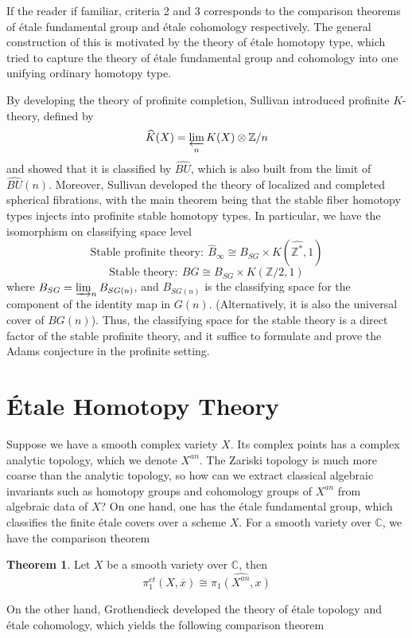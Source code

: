 \documentclass{article}
\theoremstyle{definition}
\newtheorem{theorem}{Theorem}[section]
\theoremstyle{definition}
\theoremstyle{definition}
\theoremstyle{definition}
\theoremstyle{definition}
\theoremstyle{definition}
\theoremstyle{definition}
\begin{document}
If the reader if familiar, criteria 2 and 3 corresponds to the comparison theorems of \'etale fundamental group and  \'etale cohomology respectively. The general construction of this is motivated by the theory of \'etale homotopy type, which tried to capture the theory of \'etale fundamental group and cohomology into one unifying ordinary homotopy type. 

By developing the theory of profinite completion, Sullivan introduced profinite $K$-theory, defined by 
\[\widehat{K}(X)=\varprojlim_n K(X)\otimes \mathbb{Z}/n\]
and showed that it is classified by $\widehat{BU}$, which is also built from the limit of $\widehat{BU}(n)$. Moreover, Sullivan developed the theory of localized and completed spherical fibrations, with the main theorem being that the stable fiber homotopy types injects into profinite stable homotopy types. In particular, we have the isomorphism on classifying space level 
\[\textrm{Stable profinite theory}: \ \widehat{B}_{\infty}\cong B_{SG}\times K(\widehat{\mathbb{Z}^*},1)\]
\[\textrm{Stable theory}: \ BG\cong B_{SG}\times K(\mathbb{Z}/2,1)\]
where $B_{SG}=\varinjlim_n B_{SG(n)}$, and $B_{SG(n)}$ is the classifying space for the component of the identity map in $G(n)$. (Alternatively, it is also the universal cover of $BG(n)$). Thus, the classifying space for the stable theory is a direct factor of the stable profinite theory, and it suffice to formulate and prove the Adams conjecture in the profinite setting. 








\section{\'Etale Homotopy Theory}
Suppose we have a smooth complex variety $X$. Its complex points has a complex analytic topology, which we denote $X^{an}$. The Zariski topology is much more coarse than the analytic topology, so how can we extract classical algebraic invariants such as homotopy groups and cohomology groups of $X^{an}$ from algebraic data of $X$? On one hand, one has the \'etale fundamental group, which classifies the finite \'etale covers over a scheme $X$. For a smooth variety over $\mathbb{C}$, we have the comparison theorem


\begin{tcolorbox}[colback=red!5!white,colframe=red!30!white]
\begin{theorem}
Let $X$ be a smooth variety over $\mathbb{C}$, then
\[\pi_1^{et}(X,\overline{x})\cong \widehat{\pi_1(X^{an},x)}\]
\end{theorem}
\end{tcolorbox}
On the other hand, Grothendieck developed the theory of \'etale topology and \'etale cohomology, which yields the following comparison theorem 
\end{document}
